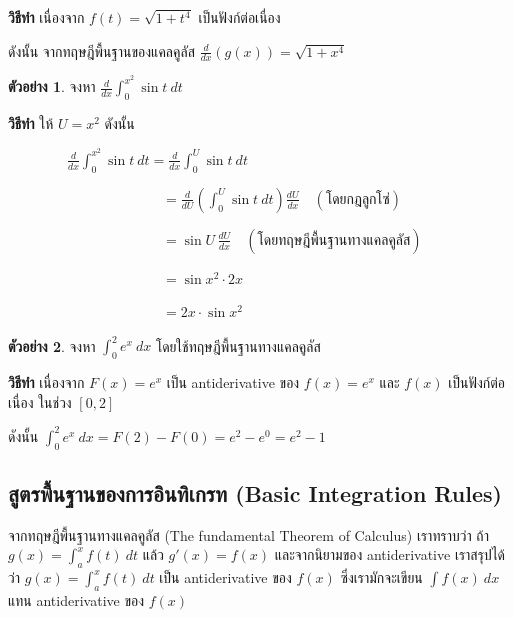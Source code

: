 \documentclass[
]{book}
\theoremstyle{definition}
\theoremstyle{definition}
\newtheorem{example}{ตัวอย่าง}[chapter]
\theoremstyle{definition}
\theoremstyle{definition}
\theoremstyle{remark}
\begin{document}
\textbf{วิธีทำ} เนื่องจาก \(\displaystyle f(t)=\sqrt{1+t^{4}}\) เป็นฟังก์ต่อเนื่อง

ดังนั้น จากทฤษฎีพื้นฐานของแคลคูลัส \(\displaystyle
\frac{d}{dx}\left(g(x)\right)=\sqrt{1+x^{4}}\)

\begin{example}
จงหา \(\displaystyle \frac{d}{dx}\int_{0}^{x^{2}}\sin t \ dt\)
\end{example}

\textbf{วิธีทำ} ให้ \(U=x^{2}\) ดังนั้น

\(\qquad \qquad \ \displaystyle \frac{d}{dx}\int_{0}^{x^{2}}\sin t \ dt
=\frac{d}{dx}\int_{0}^{U}\sin t \ dt\)

\(\qquad \qquad \qquad \qquad \qquad \quad =\displaystyle
\frac{d}{dU}\left(\int_{0}^{U}\sin t \ dt\right) \frac{dU}{dx} \quad (
\mbox{โดยกฎลูกโซ่})\)

\(\qquad \qquad \qquad \qquad \qquad \quad =\displaystyle \sin U \,
\frac{dU}{dx} \quad ( \mbox{โดยทฤษฎีพื้นฐานทางแคลคูลัส} )\)

\(\qquad \qquad \qquad \qquad \qquad \quad =\displaystyle \sin x^{2}\cdot 2x\)

\(\qquad \qquad \qquad \qquad \qquad \quad =\displaystyle 2x\cdot \sin x^{2}\)

\begin{example}
จงหา \(\displaystyle \int_{0}^{2}e^{x} \ dx\) โดยใช้ทฤษฎีพื้นฐานทางแคลคูลัส
\end{example}

\textbf{วิธีทำ} เนื่องจาก \(F(x)=e^{x}\) เป็น antiderivative ของ \(f(x)=e^{x}\) และ
\(f(x)\) เป็นฟังก์ต่อเนื่อง ในช่วง \([0,2]\)

ดังนั้น \(\displaystyle \int_{0}^{2}e^{x}\ dx = F(2)-F(0) =e^{2}-e^{0} =
e^{2}-1\)

\subsection{สูตรพื้นฐานของการอินทิเกรท (Basic Integration Rules)}\label{uxe2auxe15uxe23uxe1euxe19uxe10uxe32uxe19uxe02uxe2duxe07uxe01uxe32uxe23uxe2duxe19uxe17uxe40uxe01uxe23uxe17-basic-integration-rules}

จากทฤษฎีพื้นฐานทางแคลคูลัส (The fundamental Theorem of Calculus) เราทราบว่า ถ้า
\(\displaystyle g(x)=\int_{a}^{x}f(t) \ dt\) แล้ว \(g'(x)=f(x)\)
และจากนิยามของ antiderivative เราสรุปได้ว่า
\(\displaystyle g(x)=\int_{a}^{x}f(t) \ dt\) เป็น antiderivative ของ \(f(x)\)
ซึ่งเรามักจะเขียน \(\displaystyle \int f(x) \ dx\) แทน antiderivative ของ
\(f(x)\)
\end{document}
